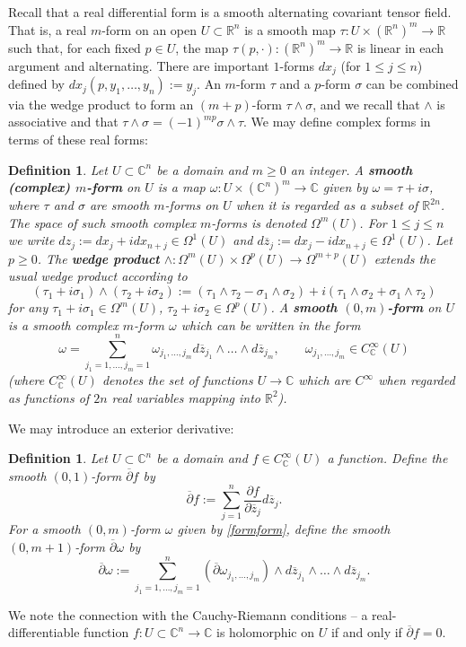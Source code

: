 \documentclass[11pt,a4paper, final, twoside]{article}
\newtheorem{definition}[theorem]{Definition}
\numberwithin{equation}{section}
\newcommand{\C}{\mathbb C}
\newcommand{\R}{\mathbb R}
\newcommand{\con}[1]{\overline{#1}}
\newcommand{\form}[1]{\Omega^{#1}}
\newcommand{\cts}{C}
\newcommand{\ccts}{C_{\mathbb C}}
\begin{document}
Recall that a real differential form is a smooth alternating covariant tensor field. That is, a real $m$-form on an open $U\subset\R^n$ is a smooth map $\tau\colon U\times(\R^n)^m\to\R$ such that, for each
fixed $p\in U$, the map $\tau(p,\cdot)\colon(\R^n)^m\to\R$ is linear in each argument and alternating. There are important $1$-forms $dx_j$ (for $1\leq j\leq n$) defined by $dx_j(p,y_1,\dots, y_n):=y_j$.
An $m$-form $\tau$ and a $p$-form $\sigma$ can be combined via the wedge product to form an $(m+p)$-form $\tau\wedge\sigma$, and we recall that $\wedge$ is associative and that 
$\tau\wedge\sigma = (-1)^{mp}\sigma\wedge\tau$. 
We may define complex forms in terms of these real forms:
\begin{definition}
Let $U\subset\C^n$ be a domain and $m\geq 0$ an integer. A \textbf{smooth (complex) $m$-form} on $U$ is a map $\omega\colon U\times (\C^n)^m\to\C$ 
given by $\omega = \tau+i\sigma$, where $\tau$ and $\sigma$ are smooth $m$-forms on $U$ when it is regarded as a subset of $\R^{2n}$. The space of such smooth complex $m$-forms is denoted
$\form{m}(U)$. For $1\leq j\leq n$ we write
$dz_j:=dx_j+idx_{n+j}\in\form{1}(U)$ and $d\con z_j:=dx_j-idx_{n+j}\in\form{1}(U)$. Let $p\geq 0$. The \textbf{wedge product} $\wedge\colon\form{m}(U)\times\form{p}(U)\to\form{m+p}(U)$ extends
the usual wedge product according to
$$ (\tau_1+i\sigma_1)\wedge (\tau_2+i\sigma_2):= (\tau_1\wedge\tau_2-\sigma_1\wedge\sigma_2)+i(\tau_1\wedge \sigma_2+\sigma_1\wedge\tau_2)$$
for any $\tau_1+i\sigma_1\in\form{m}(U)$, $\tau_2+i\sigma_2\in\form{p}(U)$. A \textbf{smooth $(0,m)$-form} on $U$ is a smooth complex $m$-form $\omega$
which can be written in the form
\begin{equation} \omega = \sum_{j_1=1,\dots,j_m=1}^n \omega_{j_1,\dots,j_m} d\con z_{j_1}\wedge\dots \wedge d\con z_{j_m},\qquad \omega_{j_1,\dots,j_m}\in\ccts^\infty(U)\label{formform}\end{equation}
(where $\ccts^\infty(U)$ denotes the set of functions $U\to\C$ which are $\cts^\infty$ when regarded as functions of $2n$ real variables mapping into $\R^2$).
\end{definition}
We may introduce an exterior derivative:
\begin{definition}
Let $U\subset\C^n$ be a domain and $f\in\ccts^\infty(U)$ a function. Define the smooth $(0,1)$-form $\con\partial f$ by 
$$ \con\partial f:=\sum_{j=1}^n \frac{\partial f}{\partial \con z_j} d\con z_j. $$
For a smooth $(0,m)$-form $\omega$ given by \eqref{formform}, define the smooth $(0,m+1)$-form $\con\partial\omega$ by 
$$ \con\partial\omega := \sum_{j_1=1,\dots,j_m=1}^n (\con\partial \omega_{j_1,\dots,j_m})\wedge d\con z_{j_1}\wedge\dots\wedge d\con z_{j_m}.$$
\end{definition}
We note the connection with the Cauchy-Riemann conditions -- a real-differentiable function $f\colon U\subset\C^n\to\C$ is holomorphic on $U$ 
if and only if $\con\partial f=0$.
\end{document}
